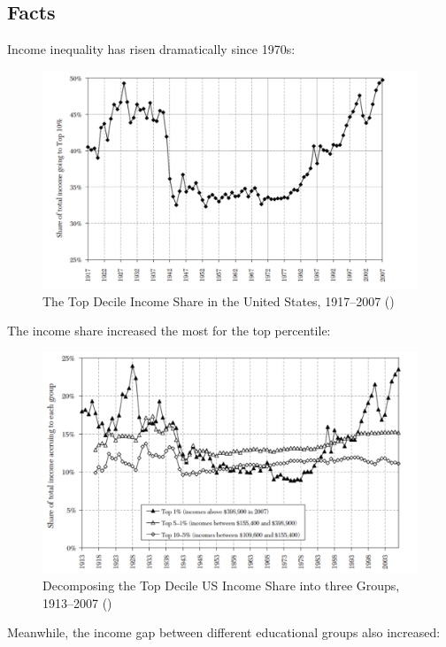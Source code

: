     \subsection{Facts}

        Income inequality has risen dramatically since 1970s:

        \begin{figure}[H]
            \centering
            \includegraphics[width=4.5in]{images/ch13/13_inequality_1.png}
            \caption{The Top Decile Income Share in the United States, 1917–2007 (\cite{atkinson_top_2011})}
        \end{figure}

        The income share increased the most for the top percentile:

        \begin{figure}[H]
            \centering
            \includegraphics[width=4.5in]{images/ch13/13_inequality_2.png}
            \caption{Decomposing the Top Decile US Income Share into three Groups, 1913–2007 (\cite{atkinson_top_2011})}
        \end{figure}

        Meanwhile, the income gap between different educational groups also increased:


